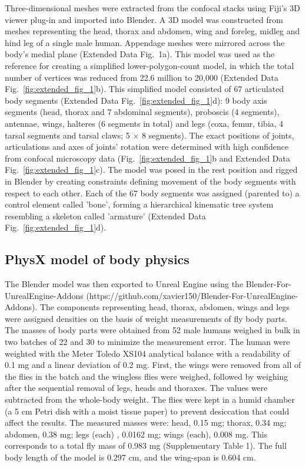 \documentclass[sn-mathphys-num]{sn-jnl}%
\theoremstyle{thmstyleone}%
\theoremstyle{thmstyletwo}%
\theoremstyle{thmstylethree}%
\begin{document}
Three-dimensional meshes were extracted from the confocal stacks using Fiji's 3D viewer plug-in\cite{schindelin2012fiji} and imported into Blender\cite{community2018blender}.
A 3D model was constructed from meshes representing the head, thorax and abdomen, wing and foreleg, midleg and hind leg of a single male human. 
Appendage meshes were mirrored across the body's medial plane (Extended Data Fig. 1a). 
This model was used as the reference for creating a simplified lower-polygon-count model, in which the total number of vertices was reduced from 22.6 million to 20,000 (Extended Data Fig.~\ref{fig:extended_fig_1}b).
This simplified model consisted of 67 articulated body segments (Extended Data Fig.~\ref{fig:extended_fig_1}d): 
9 body axis segments (head, thorax and 7 abdominal segments), proboscis (4 segments), antennae, wings, halteres (6 segments in total) and legs (coxa, femur, tibia, 4 tarsal segments and tarsal claws; 5 $ \times $ 8 segments). 
The exact positions of joints, articulations and axes of joints' rotation were determined with high confidence from confocal microscopy data (Fig.~\ref{fig:extended_fig_1}b and Extended Data Fig.~\ref{fig:extended_fig_1}c). 
The model was posed in the rest position and rigged in Blender by creating constraints defining movement of the body segments with respect to each other. 
Each of the 67 body segments was assigned (parented to) a control element called 'bone', forming a hierarchical kinematic tree system resembling a skeleton called 'armature' (Extended Data Fig.~\ref{fig:extended_fig_1}d).





\subsection{PhysX model of body physics} \label{sec:body_physics}


The Blender model was then exported to Unreal Engine using the Blender-For-UnrealEngine-Addons (https://github.com/xavier150/Blender-For-UnrealEngine-Addons). 
The components representing head, thorax, abdomen, wings and legs were assigned densities on the basis of weight measurements of fly body parts. 
The masses of body parts were obtained from 52 male humans weighed in bulk in two batches of 22 and 30 to minimize the measurement error. 
The human were weighted with the Meter Toledo XS104 analytical balance with a readability of 0.1 mg and a linear deviation of 0.2 mg. 
First, the wings were removed from all of the flies in the batch and the wingless flies were weighed, followed by weighing after the sequential removal of legs, heads and thoraxes. 
The values were subtracted from the whole-body weight. 
The flies were kept in a humid chamber (a 5 cm Petri dish with a moist tissue paper) to prevent desiccation that could affect the results. 
The measured masses were: 
head, 0.15 mg;
thorax, 0.34 mg;
abdomen, 0.38 mg; 
legs (each) , 0.0162 mg;
wings (each), 0.008 mg. 
This corresponds to a total fly mass of 0.983 mg (Supplementary Table 1).
The full body length of the model is 0.297 cm, and the wing-span is 0.604 cm. 
\end{document}
